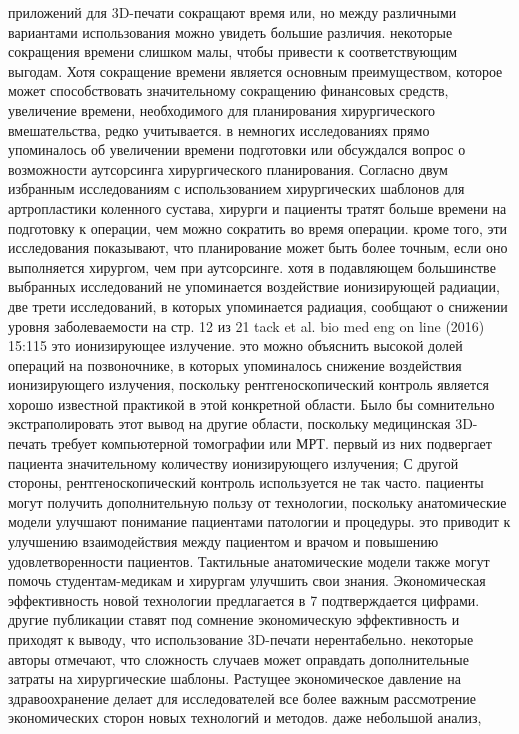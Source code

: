 приложений для 3D-печати сокращают время или, но между различными вариантами
использования можно увидеть большие различия. некоторые сокращения времени
слишком малы, чтобы привести к соответствующим выгодам. Хотя сокращение времени
является основным преимуществом, которое может способствовать значительному
сокращению финансовых средств, увеличение времени, необходимого для планирования
хирургического вмешательства, редко учитывается. в немногих исследованиях прямо
упоминалось об увеличении времени подготовки или обсуждался вопрос о возможности
аутсорсинга хирургического планирования. Согласно двум избранным исследованиям с
использованием хирургических шаблонов для артропластики коленного сустава,
хирурги и пациенты тратят больше времени на подготовку к операции, чем можно
сократить во время операции. кроме того, эти исследования показывают, что
планирование может быть более точным, если оно выполняется хирургом, чем при
аутсорсинге. хотя в подавляющем большинстве выбранных исследований не
упоминается воздействие ионизирующей радиации, две трети исследований, в которых
упоминается радиация, сообщают о снижении уровня заболеваемости на стр. 12 из 21
tack et al. bio med eng on line (2016) 15:115 это ионизирующее излучение. это
можно объяснить высокой долей операций на позвоночнике, в которых упоминалось
снижение воздействия ионизирующего излучения, поскольку рентгеноскопический
контроль является хорошо известной практикой в ​​​​этой
конкретной области. Было бы сомнительно экстраполировать этот вывод на другие
области, поскольку медицинская 3D-печать требует компьютерной томографии или
МРТ. первый из них подвергает пациента значительному количеству ионизирующего
излучения; С другой стороны, рентгеноскопический контроль используется не так
часто. пациенты могут получить дополнительную пользу от технологии, поскольку
анатомические модели улучшают понимание пациентами патологии и процедуры. это
приводит к улучшению взаимодействия между пациентом и врачом и повышению
удовлетворенности пациентов. Тактильные анатомические модели также могут помочь
студентам-медикам и хирургам улучшить свои знания. Экономическая эффективность
новой технологии предлагается в 7%
подтверждается цифрами. другие публикации ставят под сомнение экономическую
эффективность и приходят к выводу, что использование 3D-печати нерентабельно.
некоторые авторы отмечают, что сложность случаев может оправдать дополнительные
затраты на хирургические шаблоны. Растущее экономическое давление на
здравоохранение делает для исследователей все более важным рассмотрение
экономических сторон новых технологий и методов. даже небольшой анализ,
